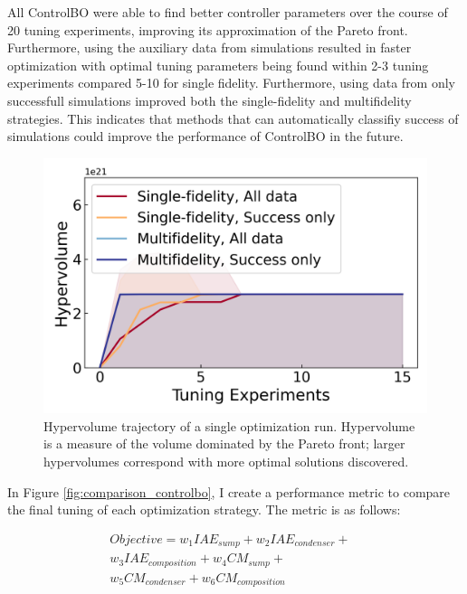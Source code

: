 All ControlBO were able to find better controller parameters over the course of 20 tuning experiments, improving its approximation of the Pareto front. Furthermore, using the auxiliary data from simulations resulted in faster optimization with optimal tuning parameters being found within 2-3 tuning experiments compared 5-10 for single fidelity. Furthermore, using data from only successfull simulations improved both the single-fidelity and multifidelity strategies. This indicates that methods that can automatically classifiy success of simulations could improve the performance of ControlBO in the future.

\begin{figure}
    \centering
    \includegraphics[width=\textwidth]{gfx/Chapter06/hypervolume_comparison.png}
    \caption{Hypervolume trajectory of a single optimization run. Hypervolume is a measure of the volume dominated by the Pareto front; larger hypervolumes correspond with more optimal solutions discovered.}
    \label{fig:hypervolume_comparison}
\end{figure}

In Figure \ref{fig:comparison_controlbo}, I create a performance metric to compare the final tuning of each optimization strategy. The metric is as follows:  

\begin{equation}
\begin{split}
    Objective = w_1 IAE_{sump} + w_2 IAE_{condenser} +  & \\ w_3 IAE_{composition} +  w_4 CM_{sump} + & \\  w_5 CM_{condenser} + w_6 CM_{composition}
\end{split}
\end{equation}

